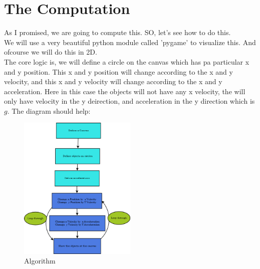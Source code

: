 \documentclass[24pt]{article}
\begin{document}
\section*{The Computation}
As I promised, we are going to compute this. SO, let's see how to do this.\\
We will use a very beautiful python module called 'pygame' to visualize this. And ofcourse we will do this in 2D. \\
 The core logic is, we will define a circle on the canvas which has pa particular x and y position. This x and y position will change according to the x and y velocity, and this x and y velocity will change according to the x and y acceleration. Here in this case the objects will not have any x velocity, the will only have velocity in the y deirection, and acceleration in the y direction which is $g$. The diagram should help: \\
\begin{figure}[h!]
\centering
	\includegraphics[width=0.5\textwidth]{fallingBodies.png}
	\caption{Algorithm}
\end{figure}\\
\end{document}
